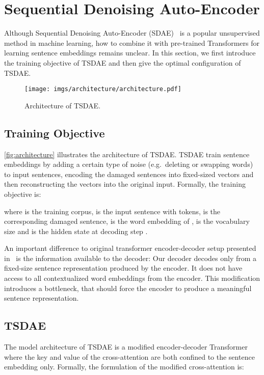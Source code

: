 \documentclass[11pt]{article}
\begin{document}
\section{Sequential Denoising Auto-Encoder} 
Although Sequential Denoising Auto-Encoder (SDAE)~\citep{DBLP:journals/jmlr/VincentLLBM10,Goodfellow-et-al-2016,DBLP:conf/naacl/HillCK16} is a popular unsupervised method in machine learning, how to combine it with pre-trained Transformers for learning sentence embeddings remains unclear. In this section, we first introduce the training objective of TSDAE and then give the optimal configuration of TSDAE.

\begin{figure}[t]
  \centering
  \texttt{[image: imgs/architecture/architecture.pdf]}
  \caption{Architecture of TSDAE.}
  \label{fig:architecture}
\end{figure}


\subsection{Training Objective}
\autoref{fig:architecture} illustrates the architecture of TSDAE. TSDAE train sentence embeddings by adding a certain type of noise (e.g.\ deleting or swapping words) to input sentences, encoding the damaged sentences into fixed-sized vectors and then reconstructing the vectors into the original input. Formally, the training objective is:

where  is the training corpus,  is the input sentence with  tokens,  is the corresponding damaged sentence,  is the word embedding of ,  is the vocabulary size and  is the hidden state at decoding step . 

An important difference to original transformer encoder-decoder setup presented in~\citet{DBLP:conf/nips/VaswaniSPUJGKP17} is the information available to the decoder: Our decoder decodes only from a fixed-size sentence representation produced by the encoder. It does not have access to all contextualized word embeddings from the encoder. This modification introduces a bottleneck, that should force the encoder to produce a meaningful sentence representation. 


\subsection{TSDAE}

The model architecture of TSDAE is a modified encoder-decoder Transformer where the key and value of the cross-attention are both confined to the sentence embedding only. Formally, the formulation of the modified cross-attention is:
\end{document}
